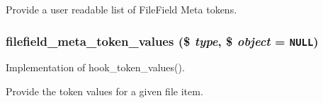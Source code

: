 Provide a user readable list of FileField Meta tokens. \hypertarget{filefield__meta_8token_8inc_a70d09102d4a2e0dce10b81ae6e87296}{
\subsubsection[{filefield\_\-meta\_\-token\_\-values}]{\setlength{\rightskip}{0pt plus 5cm}filefield\_\-meta\_\-token\_\-values (\$ {\em type}, \/  \$ {\em object} = {\tt NULL})}}
\label{filefield__meta_8token_8inc_a70d09102d4a2e0dce10b81ae6e87296}


Implementation of hook\_\-token\_\-values().

Provide the token values for a given file item. 